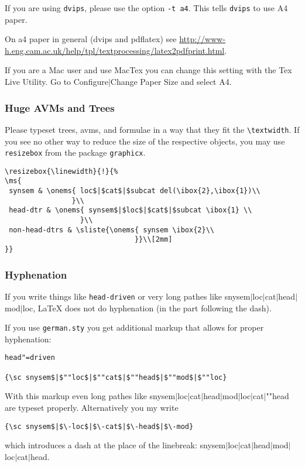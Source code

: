\documentclass[11pt,a4paper,fleqn]{article}
\begin{document}
If you are using \verb+dvips+, please use the option \verb+-t a4+. This tells
\verb+dvips+ to use A4 paper.

On a4 paper in general (dvips and pdflatex) see \url{http://www-h.eng.cam.ac.uk/help/tpl/textprocessing/latex2pdfprint.html}.

If you are a Mac user and use MacTex you can change this setting with the Tex Live Utility. Go to
Configure$|$Change Paper Size and select A4.

\subsubsection{Huge AVMs and Trees}
\label{huge}

Please typeset trees, avms, and formulae in a way that they fit the
\verb+\textwidth+. If you see no other way to reduce the size of the respective
objects, you may use \verb+resizebox+ from the package \verb+graphicx+.
{\small
\begin{verbatim}
\resizebox{\linewidth}{!}{%
\ms{
 synsem & \onems{ loc$|$cat$|$subcat del(\ibox{2},\ibox{1})\\
                }\\
 head-dtr & \onems{ synsem$|$loc$|$cat$|$subcat \ibox{1} \\
                  }\\
 non-head-dtrs & \sliste{\onems{ synsem \ibox{2}\\ 
                               }}\\[2mm]
}}
\end{verbatim}
}


\subsubsection{Hyphenation}
\label{hyphenation}

If you write things like \verb+head-driven+ or very long pathes like
{\sc snysem$|$loc$|$cat$|$head$|$mod$|$loc}, \LaTeX{} does not do hyphenation
(in the part following the dash).

If you use \verb+german.sty+ you get additional markup that allows for proper hyphenation:
\begin{verbatim}
head"=driven

{\sc snysem$|$""loc$|$""cat$|$""head$|$""mod$|$""loc}
\end{verbatim}
With this markup even long pathes like {\sc snysem$|$loc$|$cat$|$head$|$mod$|$loc$|$cat$|$""head}
are typeset properly. Alternatively you my write
\begin{verbatim}
{\sc snysem$|$\-loc$|$\-cat$|$\-head$|$\-mod}
\end{verbatim}
which introduces a dash at the place of the linebreak:
{\sc snysem$|$\-loc$|$\-cat$|$\-head$|$\-mod$|$\-loc$|$\-cat$|$\-head}.
\end{document}
